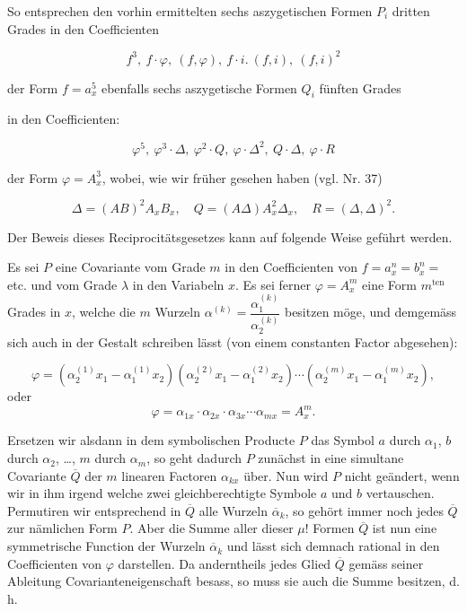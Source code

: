 \documentclass[11pt]{article}
\providecommand{\weberpage}[1]{}
\let\Delta\varDelta
\begin{document}
So entsprechen den vorhin ermittelten sechs aszygetischen Formen $P_i$ dritten Grades in den Coefficienten

\[
f^3,\ f\cdot\varphi,\ (f,\varphi),\ f\cdot i.\ (f,i),\ (f,i)^2
\]

der Form $f=a_x^5$ ebenfalls sechs aszygetische Formen $Q_i$ fünften Grades


\weberpage{98}
in den Coefficienten:

\[
\varphi^5,\ \varphi^3\cdot\Delta,\ \varphi^2\cdot Q,\ \varphi\cdot\Delta^2,\ Q\cdot\Delta,\ \varphi\cdot R
\]

der Form $\varphi=A_x^3$, wobei, wie wir früher gesehen haben (vgl. Nr. 37)

\[
\Delta=(AB)^2A_xB_x,\quad Q=(A\Delta)A_x^2\Delta_x,\quad R=(\Delta,\Delta)^2.
\]

Der Beweis dieses Reciprocitätsgesetzes kann auf folgende Weise geführt werden.

Es sei $P$ eine Covariante vom Grade $m$ in den Coefficienten von $f=a_x^n=b_x^n=$ etc. und vom Grade $\lambda$ in den Variabeln $x$. Es sei ferner $\varphi=A_x^m$ eine Form $m^{\mathrm{ten}}$ Grades in $x$, welche die $m$ Wurzeln $\alpha^{(k)}=\dfrac{\alpha_1^{(k)}}{\alpha_2^{(k)}}$ besitzen möge, und demgemäss sich auch in der Gestalt schreiben lässt (von einem constanten Factor abgesehen):

\[
\varphi=(\alpha_2^{(1)}x_1-\alpha_1^{(1)}x_2)(\alpha_2^{(2)}x_1-\alpha_1^{(2)}x_2)\cdots(\alpha_2^{(m)}x_1-\alpha_1^{(m)}x_2),
\]
oder
\[
\varphi=\alpha_{1x}\cdot\alpha_{2x}\cdot\alpha_{3x}\cdots\alpha_{mx}=A_x^m.
\]

Ersetzen wir alsdann in dem symbolischen Producte $P$ das Symbol $a$ durch $\alpha_1$, $b$ durch $\alpha_2$, \dots, $m$ durch $\alpha_m$, so geht dadurch $P$ zunächst in eine simultane Covariante $\overline{Q}$ der $m$ linearen Factoren $\alpha_{kx}$ über. Nun wird $P$ nicht geändert, wenn wir in ihm irgend welche zwei gleichberechtigte Symbole $a$ und $b$ vertauschen. Permutiren wir entsprechend in $\overline{Q}$ alle Wurzeln $\overline{\alpha}_k$, so gehört immer noch jedes $\overline{Q}$ zur nämlichen Form $P$. Aber die Summe aller dieser $\mu!$ Formen $\overline{Q}$ ist nun eine symmetrische Function der Wurzeln $\overline{\alpha}_k$ und lässt sich demnach rational in den Coefficienten von $\varphi$ darstellen. Da anderntheils jedes Glied $\overline{Q}$ gemäss seiner Ableitung Covarianteneigenschaft besass, so muss sie auch die Summe besitzen, d. h.
\end{document}
